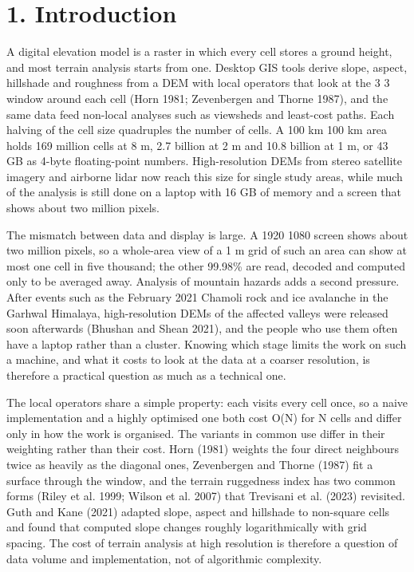 \documentclass[10pt,a4paper]{article}
\begin{document}
\section*{1. Introduction}
A digital elevation model is a raster in which every cell stores a ground height, and most terrain analysis starts from one. Desktop GIS tools derive slope, aspect, hillshade and roughness from a DEM with local operators that look at the 3 \texttimes{} 3 window around each cell (Horn 1981; Zevenbergen and Thorne 1987), and the same data feed non-local analyses such as viewsheds and least-cost paths. Each halving of the cell size quadruples the number of cells. A 100 km \texttimes{} 100 km area holds 169 million cells at 8 m, 2.7 billion at 2 m and 10.8 billion at 1 m, or 43 GB as 4-byte floating-point numbers. High-resolution DEMs from stereo satellite imagery and airborne lidar now reach this size for single study areas, while much of the analysis is still done on a laptop with 16 GB of memory and a screen that shows about two million pixels.

The mismatch between data and display is large. A 1920 \texttimes{} 1080 screen shows about two million pixels, so a whole-area view of a 1 m grid of such an area can show at most one cell in five thousand; the other 99.98\% are read, decoded and computed only to be averaged away. Analysis of mountain hazards adds a second pressure. After events such as the February 2021 Chamoli rock and ice avalanche in the Garhwal Himalaya, high-resolution DEMs of the affected valleys were released soon afterwards (Bhushan and Shean 2021), and the people who use them often have a laptop rather than a cluster. Knowing which stage limits the work on such a machine, and what it costs to look at the data at a coarser resolution, is therefore a practical question as much as a technical one.

The local operators share a simple property: each visits every cell once, so a naive implementation and a highly optimised one both cost O(N) for N cells and differ only in how the work is organised. The variants in common use differ in their weighting rather than their cost. Horn (1981) weights the four direct neighbours twice as heavily as the diagonal ones, Zevenbergen and Thorne (1987) fit a surface through the window, and the terrain ruggedness index has two common forms (Riley et al. 1999; Wilson et al. 2007) that Trevisani et al. (2023) revisited. Guth and Kane (2021) adapted slope, aspect and hillshade to non-square cells and found that computed slope changes roughly logarithmically with grid spacing. The cost of terrain analysis at high resolution is therefore a question of data volume and implementation, not of algorithmic complexity.
\end{document}
